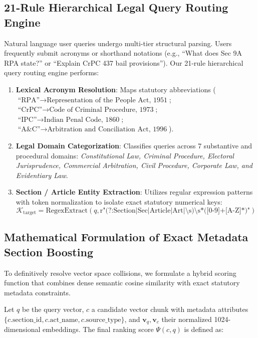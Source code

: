 \documentclass{llncs}
\begin{document}
\subsection{21-Rule Hierarchical Legal Query Routing Engine}
Natural language user queries undergo multi-tier structural parsing. Users frequently submit acronyms or shorthand notations (e.g., ``What does Sec 9A RPA state?'' or ``Explain CrPC 437 bail provisions''). Our 21-rule hierarchical query routing engine performs:
\begin{enumerate}
    \item \textbf{Lexical Acronym Resolution}: Maps statutory abbreviations ($\text{``RPA''} \rightarrow \text{Representation of the People Act, 1951}$; $\text{``CrPC''} \rightarrow \text{Code of Criminal Procedure, 1973}$; $\text{``IPC''} \rightarrow \text{Indian Penal Code, 1860}$; $\text{``A\&C''} \rightarrow \text{Arbitration and Conciliation Act, 1996}$).
    \item \textbf{Legal Domain Categorization}: Classifies queries across 7 substantive and procedural domains: \textit{Constitutional Law, Criminal Procedure, Electoral Jurisprudence, Commercial Arbitration, Civil Procedure, Corporate Law, and Evidentiary Law}.
    \item \textbf{Section / Article Entity Extraction}: Utilizes regular expression patterns with token normalization to isolate exact statutory numerical keys:
    \begin{equation}
    \mathcal{K}_{\text{target}} = \text{RegexExtract}\left( q, \text{r"(?:Section|Sec|Article|Art|\textbackslash s)\textbackslash s*([0-9]+[A-Z]*)"} \right)
    \end{equation}
\end{enumerate}

\subsection{Mathematical Formulation of Exact Metadata Section Boosting}
To definitively resolve vector space collisions, we formulate a hybrid scoring function that combines dense semantic cosine similarity with exact statutory metadata constraints. 

Let $q$ be the query vector, $c$ a candidate vector chunk with metadata attributes $\{c.\text{section\_id}, c.\text{act\_name}, c.\text{source\_type}\}$, and $\mathbf{v}_q, \mathbf{v}_c$ their normalized 1024-dimensional embeddings. The final ranking score $\Psi(c, q)$ is defined as:
\end{document}
